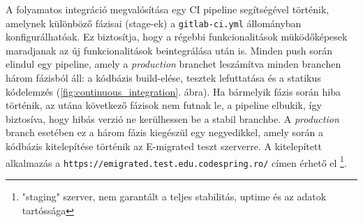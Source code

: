 A folyamatos integráció megvalósítása egy CI pipeline segítségével történik, amelynek különböző fázisai (stage-ek) a \texttt{gitlab-ci.yml} állományban  konfigurálhatóak. Ez biztosítja, hogy a régebbi funkcionalitások müködőképesek maradjanak az új funkcionalitások beintegrálása után is. Minden push során elindul egy pipeline, amely a \textit{production} branchet leszámítva minden branchen három fázisból áll: a kódbázis build-elése, tesztek lefuttatása és a statikus kódelemzés (\ref{fig:continuous_integration}. ábra). Ha bármelyik fázis során hiba történik, az utána következő fázisok nem futnak le, a pipeline elbukik, így biztosíva, hogy hibás verzió ne kerülhessen be a stabil branchbe. A \textit{production} branch esetében ez a három fázis kiegészül egy negyedikkel, amely során a kódbázis kitelepítése történik az E-migrated teszt szerverre. A kitelepített alkalmazás a \texttt{https://emigrated.test.edu.codespring.ro/} címen érhető el \footnote{"staging" szerver, nem garantált a teljes stabilitás, uptime és az adatok tartóssága}. 



